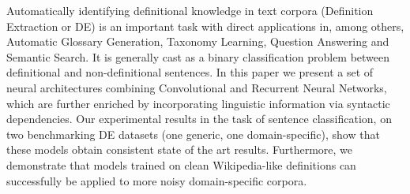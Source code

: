 Automatically identifying definitional knowledge in text corpora (Definition Extraction or DE) is an important task with direct applications in, among others, Automatic Glossary Generation, Taxonomy Learning, Question Answering and Semantic Search. It is generally cast as a binary classification problem between definitional and non-definitional sentences. In this paper we present a set of neural architectures combining Convolutional and Recurrent Neural Networks, which are further enriched by incorporating linguistic information via syntactic dependencies. Our experimental results in the task of sentence classification, on two benchmarking DE datasets (one generic, one domain-specific), show that these models obtain consistent state of the art results. Furthermore, we demonstrate that models trained on clean Wikipedia-like definitions can successfully be applied to more noisy domain-specific corpora.
